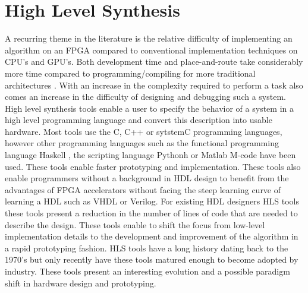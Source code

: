 

\chapter{High Level Synthesis}



A recurring theme in the literature is the relative difficulty of implementing an algorithm on an FPGA compared to conventional implementation techniques on CPU's and GPU's. Both development time and place-and-route take considerably more time compared to programming/compiling for more traditional architectures \cite{inta_chimera:_2012,tsoi_axel:_2010}. With an increase in the complexity required to perform a task also comes an increase in the difficulty of designing and debugging such a system. 
High level synthesis tools enable a user to specify the behavior of a system in a high level programming language and convert this description into usable hardware. Most tools use the C, C++ or sytstemC programming languages, however other programming languages such as the functional programming language Haskell \cite{baaij2010c}, the scripting language Pythonh\cite{decaluwe2004myhdl} or Matlab M-code\cite{hdlcoder} have been used. These tools enable faster prototyping and implementation\cite{che_accelerating_2008}. These tools also enable programmers without a background in HDL design to benefit from the advantages of FPGA accelerators without facing the steep learning curve of learning a HDL such as VHDL or Verilog. For existing HDL designers HLS tools these tools present a reduction in the number of lines of code that are needed to describe the design\cite{casseau_c-_2005}. 
These tools enable to shift the focus from low-level implementation details to the development and improvement of the algorithm in a rapid prototyping fashion\cite{wakabayashi_c-based_2004}.
HLS tools have a long history dating back to the 1970's but only recently have these tools matured enough to become adopted by industry. These tools present an interesting evolution and a possible paradigm shift in hardware design and prototyping\cite{cong_high-level_2011}.




